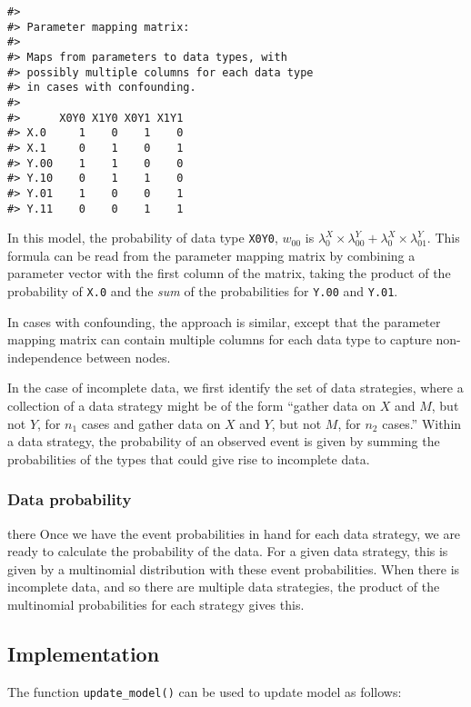 \documentclass[
  11pt,
  article]{jss}
\begin{document}
\begin{verbatim}
#> 
#> Parameter mapping matrix: 
#> 
#> Maps from parameters to data types, with 
#> possibly multiple columns for each data type 
#> in cases with confounding. 
#> 
#>      X0Y0 X1Y0 X0Y1 X1Y1
#> X.0     1    0    1    0
#> X.1     0    1    0    1
#> Y.00    1    1    0    0
#> Y.10    0    1    1    0
#> Y.01    1    0    0    1
#> Y.11    0    0    1    1
\end{verbatim}

In this model, the probability of data type \texttt{X0Y0}, \(w_{00}\) is
\(\lambda^X_0\times \lambda^Y_{00} + \lambda^X_0\times \lambda^Y_{01}\).
This formula can be read from the parameter mapping matrix by combining
a parameter vector with the first column of the matrix, taking the
product of the probability of \texttt{X.0} and the \emph{sum} of the
probabilities for \texttt{Y.00} and \texttt{Y.01}.

In cases with confounding, the approach is similar, except that the
parameter mapping matrix can contain multiple columns for each data type
to capture non-independence between nodes.

In the case of incomplete data, we first identify the set of data
strategies, where a collection of a data strategy might be of the form
``gather data on \(X\) and \(M\), but not \(Y\), for \(n_1\) cases and
gather data on \(X\) and \(Y\), but not \(M\), for \(n_2\) cases.''
Within a data strategy, the probability of an observed event is given by
summing the probabilities of the types that could give rise to
incomplete data.

\subsubsection{Data probability}\label{data-probability}

there Once we have the event probabilities in hand for each data
strategy, we are ready to calculate the probability of the data. For a
given data strategy, this is given by a multinomial distribution with
these event probabilities. When there is incomplete data, and so there
are multiple data strategies, the product of the multinomial
probabilities for each strategy gives this.

\subsection{Implementation}\label{implementation}

The function \texttt{update\_model()} can be used to update model as
follows:
\end{document}
